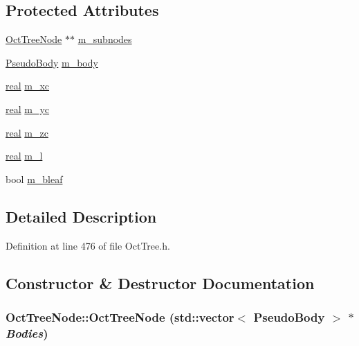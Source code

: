 \subsection*{Protected Attributes}
\begin{DoxyCompactItemize}
\item 
\hyperlink{classOctTreeNode}{OctTreeNode} $\ast$$\ast$ \hyperlink{classOctTreeNode_aa778da4b6fd434a63e0e4513c41b72a6}{m\_\-subnodes}
\item 
\hyperlink{classPseudoBody}{PseudoBody} \hyperlink{classOctTreeNode_a0ab5b2f366573315d029dcdc5016cf97}{m\_\-body}
\item 
\hyperlink{Global_8h_a031f8951175b43076c2084a6c2173410}{real} \hyperlink{classOctTreeNode_a20fc5c24ea0fbc484e172a4b1e01984b}{m\_\-xc}
\item 
\hyperlink{Global_8h_a031f8951175b43076c2084a6c2173410}{real} \hyperlink{classOctTreeNode_a53921672607551866f5d6d681b65da3c}{m\_\-yc}
\item 
\hyperlink{Global_8h_a031f8951175b43076c2084a6c2173410}{real} \hyperlink{classOctTreeNode_ac305397d3ca59d857d8bf2775f8172dc}{m\_\-zc}
\item 
\hyperlink{Global_8h_a031f8951175b43076c2084a6c2173410}{real} \hyperlink{classOctTreeNode_a361560ebacba06e8c838277643b1a713}{m\_\-l}
\item 
bool \hyperlink{classOctTreeNode_a372678b0c96bb5a49b9b5eb7838a0ca3}{m\_\-bleaf}
\end{DoxyCompactItemize}


\subsection{Detailed Description}


Definition at line 476 of file OctTree.h.



\subsection{Constructor \& Destructor Documentation}
\subsubsection[{OctTreeNode}]{\setlength{\rightskip}{0pt plus 5cm}OctTreeNode::OctTreeNode (std::vector$<$ {\bf PseudoBody} $>$ $\ast$ {\em Bodies})}\label{classOctTreeNode_a103c388aea6f83cce81b8d7433b8982c}


